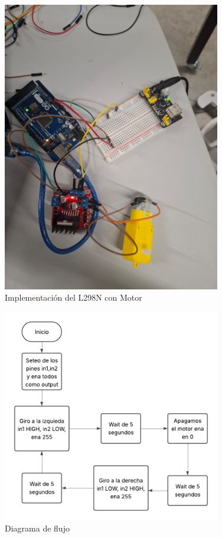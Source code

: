 \begin{figure}[H]
    \centering
    \includegraphics[width=0.85\textwidth]{./img/ckpt_presencial_298.jpeg}
    \caption{Implementación del L298N con Motor}
    \label{fig:motor_driver}
\end{figure}

\begin{figure}[H]
    \centering
    \includegraphics[width=0.85\textwidth]{./img/flujo_298.png}
    \caption{Diagrama de flujo}
    \label{fig:motor_driver}
\end{figure}


